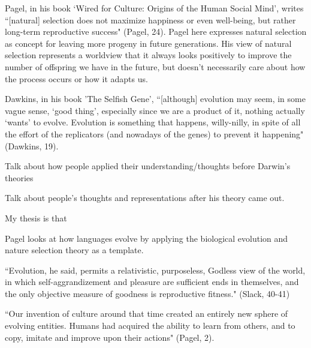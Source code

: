 \documentclass[11pt, oneside]{article}
\begin{document}
\par Pagel, in his book `Wired for Culture: Origins of the Human Social Mind', writes ``[natural] selection does not maximize happiness or even well-being, but rather long-term reproductive success" (Pagel, 24). Pagel here expresses natural selection as concept for leaving more progeny in future generations. His view of natural selection represents a worldview that it always looks positively to improve the number of offspring we have in the future, but doesn't necessarily care about how the process occurs or how it adapts us. 

\par Dawkins, in his book 'The Selfish Gene', ``[although] evolution may seem, in some vague sense, `good thing', especially since we are a product of it, nothing actually `wants' to evolve. Evolution is something that happens, willy-nilly, in spite of all the effort of the replicators (and nowadays of the genes) to prevent it happening" (Dawkins, 19).


\par Talk about how people applied their understanding/thoughts before Darwin's theories



\par Talk about people's thoughts and representations after his theory came out.

\par My thesis is that 

\par Pagel looks at how languages evolve by applying the biological evolution and nature selection theory as a template. 

``Evolution, he said, permits a relativistic, purposeless, Godless view of the world, in which self-aggrandizement and pleasure are sufficient ends in themselves, and the only objective measure of goodness is reproductive fitness." (Slack, 40-41)

``Our invention of culture around that time created an entirely new sphere of evolving entities. Humans had acquired the ability to learn from others, and to copy, imitate and improve upon their actions" (Pagel, 2).
\end{document}
